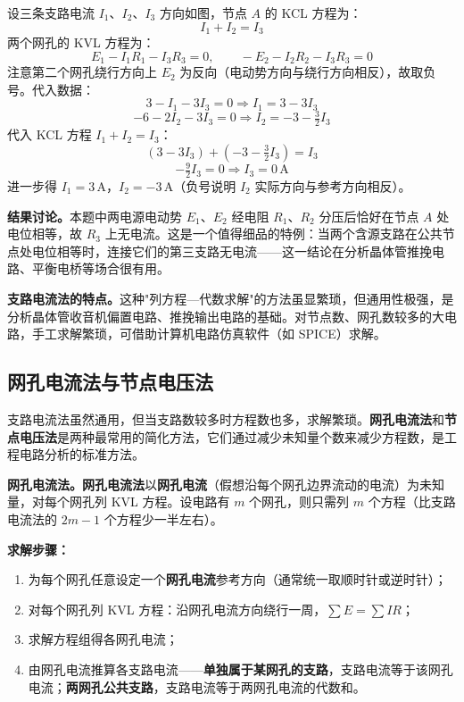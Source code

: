 \documentclass[12pt,UTF8]{ctexbook}
\begin{document}
设三条支路电流 $I_1$、$I_2$、$I_3$ 方向如图，节点 $A$ 的 KCL 方程为：
\[
I_1 + I_2 = I_3
\]
两个网孔的 KVL 方程为：
\[
E_1 - I_1 R_1 - I_3 R_3 = 0, \qquad -E_2 - I_2 R_2 - I_3 R_3 = 0
\]
注意第二个网孔绕行方向上 $E_2$ 为反向（电动势方向与绕行方向相反），故取负号。代入数据：
\[
3 - I_1 - 3 I_3 = 0 \Rightarrow I_1 = 3 - 3 I_3
\]
\[
-6 - 2 I_2 - 3 I_3 = 0 \Rightarrow I_2 = -3 - \tfrac{3}{2} I_3
\]
代入 KCL 方程 $I_1 + I_2 = I_3$：
\[
(3 - 3 I_3) + \left(-3 - \tfrac{3}{2} I_3\right) = I_3
\]
\[
-\tfrac{9}{2} I_3 = 0 \Rightarrow I_3 = 0\,\mathrm{A}
\]
进一步得 $I_1 = 3\,\mathrm{A}$，$I_2 = -3\,\mathrm{A}$（负号说明 $I_2$ 实际方向与参考方向相反）。

\textbf{结果讨论。}本题中两电源电动势 $E_1$、$E_2$ 经电阻 $R_1$、$R_2$ 分压后恰好在节点 $A$ 处电位相等，故 $R_3$ 上无电流。这是一个值得细品的特例：当两个含源支路在公共节点处电位相等时，连接它们的第三支路无电流——这一结论在分析晶体管推挽电路、平衡电桥等场合很有用。

\textbf{支路电流法的特点。}这种"列方程—代数求解"的方法虽显繁琐，但通用性极强，是分析晶体管收音机偏置电路、推挽输出电路的基础。对节点数、网孔数较多的大电路，手工求解繁琐，可借助计算机电路仿真软件（如 SPICE）求解。

\subsection{网孔电流法与节点电压法}

支路电流法虽然通用，但当支路数较多时方程数也多，求解繁琐。\textbf{网孔电流法}和\textbf{节点电压法}是两种最常用的简化方法，它们通过减少未知量个数来减少方程数，是工程电路分析的标准方法。

\textbf{网孔电流法。}\textbf{网孔电流法}以\textbf{网孔电流}（假想沿每个网孔边界流动的电流）为未知量，对每个网孔列 KVL 方程。设电路有 $m$ 个网孔，则只需列 $m$ 个方程（比支路电流法的 $2m-1$ 个方程少一半左右）。

\textbf{求解步骤：}
\begin{enumerate}
  \item 为每个网孔任意设定一个\textbf{网孔电流}参考方向（通常统一取顺时针或逆时针）；
  \item 对每个网孔列 KVL 方程：沿网孔电流方向绕行一周，$\sum E = \sum I R$；
  \item 求解方程组得各网孔电流；
  \item 由网孔电流推算各支路电流——\textbf{单独属于某网孔的支路}，支路电流等于该网孔电流；\textbf{两网孔公共支路}，支路电流等于两网孔电流的代数和。
\end{enumerate}
\end{document}
